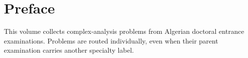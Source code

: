\documentclass[print]{docmathdz}
\begin{document}
\chapter*{Preface}
This volume collects complex-analysis problems from Algerian doctoral entrance examinations. Problems are routed individually, even when their parent examination carries another specialty label.
\mainmatter


\backmatter\printbibliography[heading=bibintoc,title={References}]\printindex
\end{document}
